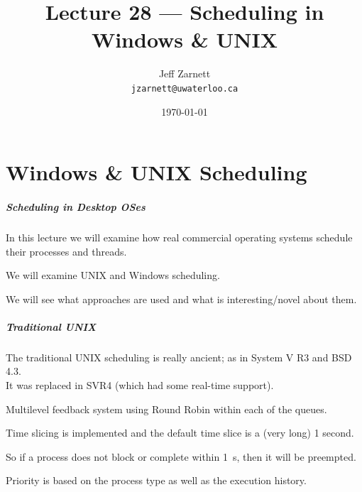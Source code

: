 

\title{Lecture 28 --- Scheduling in Windows \& UNIX}

\author{Jeff Zarnett \\ \small \texttt{jzarnett@uwaterloo.ca}}
\date{\today}




\begin{frame}
  \titlepage

 \end{frame}


\part{Windows \& UNIX Scheduling}

\begin{frame}
\partpage
\end{frame}

\begin{frame}
\frametitle{Scheduling in Desktop OSes}

In this lecture we will examine how real commercial operating systems schedule their processes and threads. 

We will examine UNIX and Windows scheduling. 

We will see what approaches are used and what is interesting/novel about them.


\end{frame}

\begin{frame}
\frametitle{Traditional UNIX}

The traditional UNIX scheduling is really ancient; as in System V R3 and BSD 4.3.\\
\quad It was replaced in SVR4 (which had some real-time support).

Multilevel feedback system using Round Robin within each of the queues. 

Time slicing is implemented and the default time slice is a (very long) 1 second. 

So if a process does not block or complete within 1~s, then it will be preempted. 

Priority is based on the process type as well as the execution history.

\end{frame}

